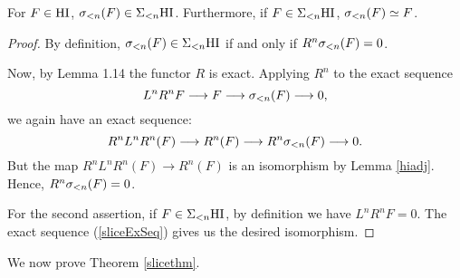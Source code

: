 \begin{lem}\label{hislice}
For $F \in \mathrm{HI}$, $\sigma_{< n}(F) \in \Sigma_{< n}\mathrm{HI}$. 
Furthermore, if $F \in \Sigma_{< n} \mathrm{HI}$, $\sigma_{<n}(F)
\simeq F$.
\end{lem}
\begin{proof}
By definition, $\sigma_{<n}(F) \in \Sigma_{< n}\mathrm{HI}$ if
and only if $R^n \sigma_{<n}(F) = 0$.

Now, by \cite{Deg10} Lemma 1.14 the functor $R$ is exact. Applying 
$R^n$ to the exact sequence
\begin{equation}\label{sliceExSeq}
L^nR^n F \longrightarrow F \longrightarrow \sigma_{< n}(F)
\longrightarrow 0,
\end{equation}
we again have an exact sequence:
\[
R^nL^nR^n (F) \longrightarrow R^n(F) \longrightarrow 
R^n\sigma_{< n}(F) \longrightarrow 0.
\]
But the map $R^nL^nR^n(F) \rightarrow R^n(F)$ is an isomorphism 
by Lemma \ref{hiadj}. Hence, $R^n\sigma_{< n}(F) = 0$.

For the second assertion, if $F \in \Sigma_{< n} \mathrm{HI}$,
by definition we have $L^nR^nF = 0$. The exact sequence 
(\ref{sliceExSeq}) gives us the desired isomorphism.
\end{proof}

We now prove Theorem \ref{slicethm}.

